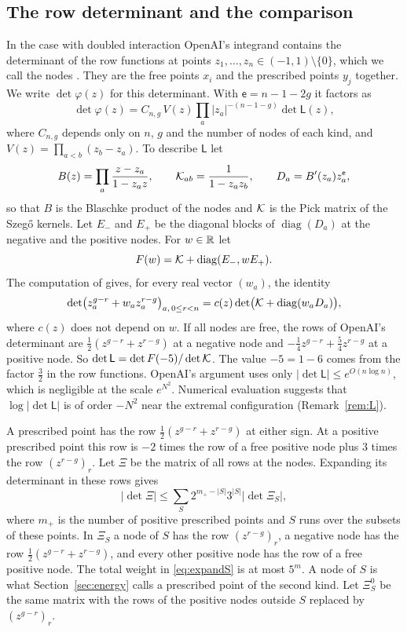 \subsection{The row determinant and the comparison}\label{ssec:rowdet}
In the case with doubled interaction OpenAI's integrand contains the determinant of the row functions at
points $z_1,\ldots,z_n\in(-1,1)\setminus\{0\}$, which we call the nodes \cite[Prop.~5.2]{OpenAI2026}. They are
the free points $x_i$ and the prescribed points $y_j$ together. We write $\det\varphi(z)$ for this determinant. With $\mathsf e=n-1-2g$ it factors as
\begin{equation}\label{eq:detphi}
 \det\varphi(z)=C_{n,g}\,V(z)\prod_a|z_a|^{-(n-1-g)}\det\mathsf L(z),
\end{equation}
where $C_{n,g}$ depends only on $n$, $g$ and the number of nodes of each kind, and $V(z)=\prod_{a<b}(z_b-z_a)$. To describe $\mathsf L$ let
\[
 B(z)=\prod_a\frac{z-z_a}{1-z_az},\qquad \mathcal K_{ab}=\frac1{1-z_az_b},\qquad D_a=B'(z_a)z_a^{\mathsf e},
\]
so that $B$ is the Blaschke product of the nodes and $\mathcal K$ is the Pick matrix of the Szeg\H{o} kernels. Let
$E_-$ and $E_+$ be the diagonal blocks of $\operatorname{diag}(D_a)$ at the negative and the positive nodes.
For $w\in\mathbb R$ let
\[
 F(w)=\mathcal K+\operatorname{diag}(E_-,wE_+).
\]
The computation of \cite[Prop.~5.2]{OpenAI2026} gives, for every real vector $(w_a)$, the identity
\begin{equation}\label{eq:laurent}
 \det\bigl(z_a^{g-r}+w_az_a^{r-g}\bigr)_{a,\,0\le r<n}=c(z)\det\bigl(\mathcal K+\operatorname{diag}(w_aD_a)\bigr),
\end{equation}
where $c(z)$ does not depend on $w$. If all nodes are free, the rows of OpenAI's determinant are
$\frac12(z^{g-r}+z^{r-g})$ at a negative node and $-\frac14z^{g-r}+\frac54z^{r-g}$ at a positive node. So
$\det\mathsf L=\det F(-5)/\det\mathcal K$. The value $-5=1-6$ comes from the factor $\frac32$ in the row functions.
OpenAI's argument uses only $|\det\mathsf L|\le e^{O(n\log n)}$, which is negligible at the scale $e^{N^2}$. Numerical
evaluation suggests that $\log|\det\mathsf L|$ is of order $-N^2$ near the extremal configuration
(Remark~\ref{rem:L}).

A prescribed point has the row $\frac12(z^{g-r}+z^{r-g})$ at either sign. At a positive prescribed point this row
is $-2$ times the row of a free positive node plus $3$ times the row $(z^{r-g})_r$. Let $\Xi$ be the matrix of
all rows at the nodes. Expanding its determinant in these rows gives
\begin{equation}\label{eq:expandS}
 |\det\Xi|\le\sum_{S}2^{m_+-|S|}3^{|S|}|\det\Xi_S|,
\end{equation}
where $m_+$ is the number of positive prescribed points and $S$ runs over the subsets of these points. In
$\Xi_S$ a node of $S$ has the row $(z^{r-g})_r$, a negative node has the row $\frac12(z^{g-r}+z^{r-g})$,
and every other positive node has the row of a free positive node. The total weight in \eqref{eq:expandS} is at
most $5^m$. A node of $S$ is what Section~\ref{sec:energy} calls a prescribed point of the second kind. Let
$\Xi^0_S$ be the same matrix with the rows of the positive nodes outside $S$ replaced by $(z^{g-r})_r$.

